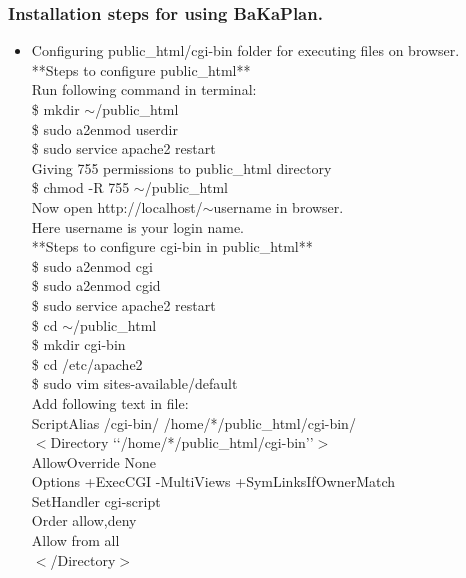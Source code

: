 \subsubsection{Installation steps for using BaKaPlan.}
\vskip 0.5cm
\begin{itemize} 
\item Configuring public\_html/cgi-bin folder for executing files on browser.\\
    
**Steps to configure public\_html**\\
\tab Run following command in terminal:   \\
\tab \$ mkdir $\sim$/public\_html\\
\tab \$ sudo a2enmod userdir\\
\tab \$ sudo service apache2 restart\\
        
Giving 755 permissions to public\_html directory\\
\tab \$ chmod -R 755 $\sim$/public\_html\\

Now open http://localhost/$\sim$username in browser.\\
Here username is your login name.\\
    
**Steps to configure cgi-bin in public\_html**\\    
\tab \$ sudo a2enmod cgi\\
\tab \$ sudo a2enmod cgid\\
\tab \$ sudo service apache2 restart\\
\tab \$ cd $\sim$/public\_html\\
\tab \$ mkdir cgi-bin\\
\tab \$ cd /etc/apache2\\
\tab \$ sudo vim sites-available/default\\
    
Add following text in file:\\
    
\tab ScriptAlias /cgi-bin/ /home/*/public\_html/cgi-bin/\\
\tab $<$Directory \lq\lq/home/*/public\_html/cgi-bin\rq\rq$>$\\
\tab AllowOverride None\\
\tab Options +ExecCGI -MultiViews +SymLinksIfOwnerMatch\\
\tab SetHandler cgi-script\\
\tab Order allow,deny\\
\tab Allow from all\\
\tab $<$/Directory$>$\\
    

\end{itemize}
